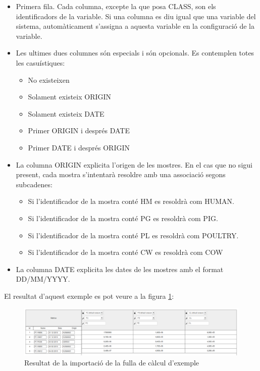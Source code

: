 \begin{itemize}
\item Primera fila. Cada columna, excepte la que posa CLASS, son els identificadors de la variable. Si una columna es diu igual que una variable del sistema, automàticament s'assigna a aquesta variable en la configuració de la variable.
\item Les ultimes dues columnes s\'{o}n especials i s\'{o}n opcionals. Es contemplen totes les casuístiques:
\begin{itemize}
\item No existeixen
\item Solament existeix ORIGIN
\item Solament existeix DATE
\item Primer ORIGIN i després DATE
\item Primer DATE i després ORIGIN
\end{itemize}
\item La columna ORIGIN explicita l'origen de les mostres. En el cas que no sigui present, cada mostra s'intentar\`{a} resoldre amb una associació segons subcadenes:
\begin{itemize}
\item Si l'identificador de la mostra cont\'{e} HM es resoldrà com HUMAN.
\item Si l'identificador de la mostra cont\'{e} PG es resoldrà com PIG.
\item Si l'identificador de la mostra cont\'{e} PL es resoldrà com POULTRY.
\item Si l'identificador de la mostra cont\'{e} CW es resoldrà com COW
\end{itemize}
\item La columna DATE explicita les dates de les mostres amb el format DD/MM/YYYY.
\end{itemize}

El resultat d'aquest exemple es pot veure a la figura \ref{fig:matrixResulting}:
\begin{figure}[h!]
  \centering
  \includegraphics[scale=0.3]{img/userguide/matrix_resulting.png}
  \caption{Resultat de la importació de la fulla de c\`{a}lcul d'exemple}
  \label{fig:matrixResulting}
\end{figure}

